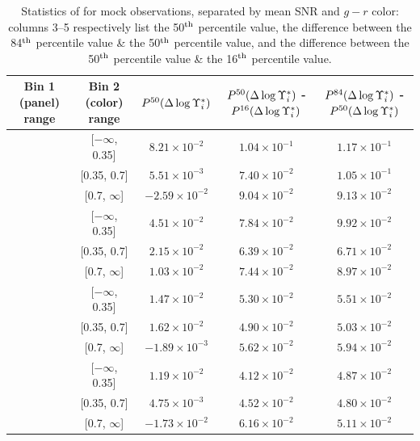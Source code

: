 \begin{table}[p]
    \centering
    \begin{tabular}{||c|c|c|c|c||} \hline \hline
        Bin 1 (panel) range & Bin 2 (color) range & $P^{50}(\Delta \log \Upsilon^*_{i})$ & $P^{50}(\Delta \log \Upsilon^*_{i})$  - $P^{16}(\Delta \log \Upsilon^*_{i})$ & $P^{84}(\Delta \log \Upsilon^*_{i})$ - $P^{50}(\Delta \log \Upsilon^*_{i})$ \\ \hline \hline
        [$-\infty$, 2.0] & [$-\infty$, 0.35] & $8.21 \times 10^{-2}$ & $1.04 \times 10^{-1}$ & $1.17 \times 10^{-1}$ \\ \hline
        [$-\infty$, 2.0] & [0.35, 0.7] & $5.51 \times 10^{-3}$ & $7.40 \times 10^{-2}$ & $1.05 \times 10^{-1}$ \\ \hline
        [$-\infty$, 2.0] & [0.7, $\infty$] & $-2.59 \times 10^{-2}$ & $9.04 \times 10^{-2}$ & $9.13 \times 10^{-2}$ \\ \hline
        [2.0, 10.0] & [$-\infty$, 0.35] & $4.51 \times 10^{-2}$ & $7.84 \times 10^{-2}$ & $9.92 \times 10^{-2}$ \\ \hline
        [2.0, 10.0] & [0.35, 0.7] & $2.15 \times 10^{-2}$ & $6.39 \times 10^{-2}$ & $6.71 \times 10^{-2}$ \\ \hline
        [2.0, 10.0] & [0.7, $\infty$] & $1.03 \times 10^{-2}$ & $7.44 \times 10^{-2}$ & $8.97 \times 10^{-2}$ \\ \hline
        [10.0, 20.0] & [$-\infty$, 0.35] & $1.47 \times 10^{-2}$ & $5.30 \times 10^{-2}$ & $5.51 \times 10^{-2}$ \\ \hline
        [10.0, 20.0] & [0.35, 0.7] & $1.62 \times 10^{-2}$ & $4.90 \times 10^{-2}$ & $5.03 \times 10^{-2}$ \\ \hline
        [10.0, 20.0] & [0.7, $\infty$] & $-1.89 \times 10^{-3}$ & $5.62 \times 10^{-2}$ & $5.94 \times 10^{-2}$ \\ \hline
        [20.0, $\infty$] & [$-\infty$, 0.35] & $1.19 \times 10^{-2}$ & $4.12 \times 10^{-2}$ & $4.87 \times 10^{-2}$ \\ \hline
        [20.0, $\infty$] & [0.35, 0.7] & $4.75 \times 10^{-3}$ & $4.52 \times 10^{-2}$ & $4.80 \times 10^{-2}$ \\ \hline
        [20.0, $\infty$] & [0.7, $\infty$] & $-1.73 \times 10^{-2}$ & $6.16 \times 10^{-2}$ & $5.11 \times 10^{-2}$ \\ \hline
    \end{tabular}
    \caption[Statistics of  for mock observations, separated by mean SNR and $g - r$ color]{\fixspacing Statistics of  for mock observations, separated by mean SNR and $g - r$ color: columns 3--5 respectively list the 50$^{\rm th}$ percentile value, the difference between the 84$^{\rm th}$ percentile value \& the 50$^{\rm th}$ percentile value, and the difference between the 50$^{\rm th}$ percentile value \& the 16$^{\rm th}$ percentile value.}
    \label{tab:mocks_snr_color_devMLi}
\end{table}

